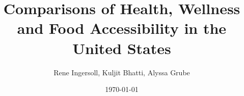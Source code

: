 \documentclass{beamer} %
\title[Comparisons of Health, Wellness and Food Accessibility in the United States]{Comparisons of Health, Wellness and Food Accessibility in the United States}
\institute[UNL]{University of Nebraska-Lincoln}
\author{Rene Ingersoll, Kuljit Bhatti, Alyssa Grube}
\date{\today}
\begin{document}


 

\begin{frame}

                \titlepage

\end{frame}

 


 

 

\begin{frame}

 

\end{frame}

 

 

 

 

\printbibliography

 
\end{document}
